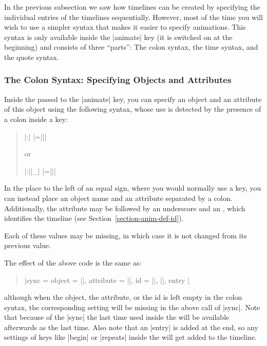 \label{section-anim-syntax-animate}

In the previous subsection we saw how timelines can be created by
specifying the individual entries of the timelines
sequentially. However, most of the time you will wish to use a simpler
syntax that makes it easier to specify animations. This syntax is 
only available inside the |animate| key (it is switched on at the
beginning) and consists of three ``parts'': The colon syntax, the time
syntax, and the quote syntax.

\subsubsection{The Colon Syntax: Specifying Objects and Attributes}

\label{section-anim-syntax-obj}

Inside the  passed to the |animate| key,
you can specify an object and an attribute of this object using the
following syntax, whose use is detected by the presence of a colon
inside a key: 
\begin{quote}
  \normalfont
  |:|
  |={||}|
  
  or
  
  |:||_|
  |={||}| 
\end{quote}
In the place to the left of an equal sign, where you would
normally use a key, you can instead place an object name and an
attribute separated by a colon. Additionally, the attribute may be
followed by an underscore and an , which identifies the
timeline (see Section~\ref{section-anim-def-id}). 

Each of these values may be missing, in which case it is not changed
from its previous value.

The effect of the above code is the same as:
\begin{quote}
  \normalfont
  |sync = { object = ||, attribute = ||, id = ||, ||, entry }|
\end{quote}
although when the object, the attribute, or the id is left empty in
the colon syntax, the corresponding setting will be missing in the
above call of |sync|. Note that because of the |sync| the last time
used inside the  will be available afterwards as the
last time. Also note that an |entry| is added at the end, so any
settings of keys like |begin| or |repeats| inside the 
will get added to the timeline.

